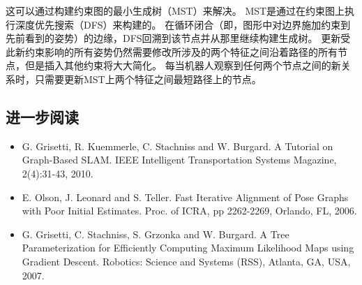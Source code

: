 这可以通过构建约束图的最小生成树（MST）来解决。 MST是通过在约束图上执行深度优先搜索（DFS）来构建的。 在循环闭合（即，图形中对边界施加约束到先前看到的姿势）的边缘，DFS回溯到该节点并从那里继续构建生成树。 更新受此新约束影响的所有姿势仍然需要修改所涉及的两个特征之间沿着路径的所有节点，但是插入其他约束将大大简化。 每当机器人观察到任何两个节点之间的新关系时，只需要更新MST上两个特征之间最短路径上的节点。

\subsection*{进一步阅读}
\begin{itemize}
\item G. Grisetti, R. Kuemmerle, C. Stachniss and W. Burgard. A Tutorial on Graph-Based SLAM. IEEE Intelligent Transportation Systems Magazine, 2(4):31-43, 2010.

\item E. Olson, J. Leonard and S. Teller. Fast Iterative Alignment of Pose Graphs with Poor Initial Estimates. Proc. of ICRA, pp 2262-2269, Orlando, FL, 2006.

\item G. Grisetti, C. Stachniss, S. Grzonka and W. Burgard. A Tree Parameterization for Efficiently Computing Maximum Likelihood Maps using Gradient Descent. Robotics: Science and Systems (RSS), Atlanta, GA, USA, 2007.
\end{itemize}
